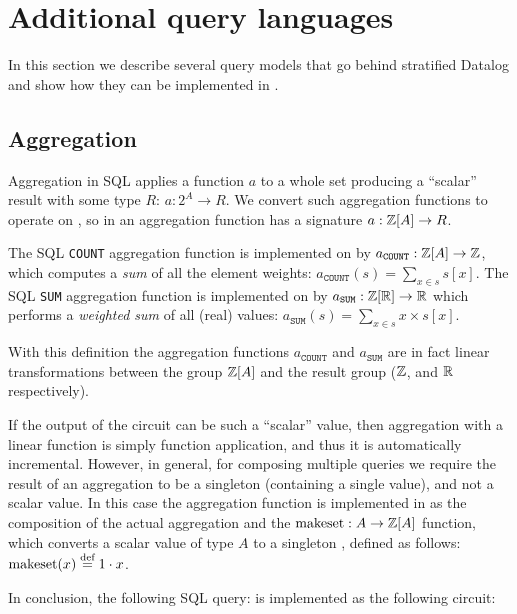 \section{Additional query languages}\label{sec:extensions}

In this section we describe several query models that go behind stratified Datalog
and show how they can be implemented in \dbsp.

\subsection{Aggregation}\label{sec:aggregation}

Aggregation in SQL applies a function $a$ to a whole set producing a ``scalar''
result with some type $R$: $a: 2^A \to R$.  We convert such aggregation
functions to operate on \zrs, so in \dbsp an aggregation function has
a signature $a: \mathbb{Z}[A] \to R$.

The SQL \texttt{COUNT} aggregation function is implemented on \zrs by $a_\texttt{COUNT} : \mathbb{Z}[A] \to \mathbb{Z}$, which
computes a \emph{sum} of all the element weights: $a_\texttt{COUNT}(s) = \sum_{x \in s} s[x]$.
The SQL \texttt{SUM} aggregation function is implemented on \zrs by $a_\texttt{SUM}: \mathbb{Z}[\mathbb{R}] \to \mathbb{R}$ which
performs a \emph{weighted sum} of all (real) values: $a_\texttt{SUM}(s) = \sum_{x \in s} x \times s[x]$.

With this definition the aggregation functions $a_\texttt{COUNT}$ and $a_\texttt{SUM}$ are in
fact linear transformations between the group $\mathbb{Z}[A]$ and the result group ($\mathbb{Z}$, and $\mathbb{R}$ respectively).

If the output of the \dbsp circuit can be such a ``scalar'' value, then aggregation
with a linear function is simply function application, and thus it is automatically incremental.  However, in general, for composing multiple queries
we require the result of an aggregation to be a singleton \zr (containing a single value),
and not a scalar value.  In this case the aggregation function is implemented in
\dbsp as the composition of the actual aggregation and the
$\mbox{makeset}: A \to \mathbb{Z}[A]$ function,
which converts a scalar value of type $A$ to a singleton \zr, defined as follows:
$\mbox{makeset}(x) \stackrel{\textrm{\scriptsize def}}{=} 1 \cdot x$.

In conclusion, the following SQL query:
is implemented as the following circuit:


